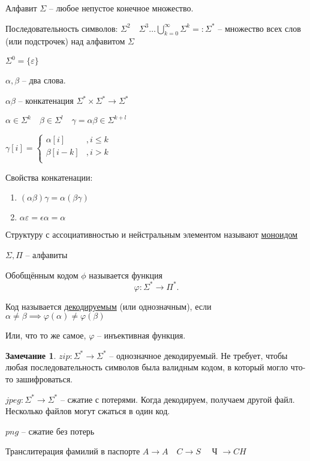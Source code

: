 \documentclass{book}
\theoremstyle{definition}
\newtheorem*{note}{Замечание}
\begin{document}
\begin{definition}
    Алфавит $\Sigma$ -- любое непустое конечное множество.
\end{definition}

Последовательность символов: $\Sigma^2\quad \Sigma^3 \ldots \bigcup\limits_{k=0}^{\infty }\Sigma^k =: \Sigma^*$ -- множество всех слов (или подстрочек) над алфавитом $\Sigma$

$\Sigma^0 = \{\varepsilon\}$

$\alpha, \beta$ -- два слова.

 \begin{definition}
    $\alpha \beta$ -- конкатенация  $\Sigma^*\times \Sigma^*\to \Sigma^*$

    $\alpha\in \Sigma^k\quad\beta\in \Sigma^l\quad \gamma = \alpha\beta \in \Sigma^{k+l}$

    $\gamma[i] = \begin{cases}
        \alpha[i]&,i\leqslant k\\
        \beta[i-k]&,i>k\\
    \end{cases}$ 
\end{definition}
Свойства конкатенации:
\begin{enumerate}
    \item $(\alpha\beta)\gamma = \alpha(\beta\gamma)$
    \item  $\alpha \varepsilon = \epsilon\alpha=\alpha$
\end{enumerate}

Структуру с ассоциативностью и нейстральным элементом называют \underline{моноидом}

\begin{definition}
$\Sigma, \Pi$ -- алфавиты

    Обобщённым кодом $\phi$ называется функция  \[
    \varphi:\Sigma^* \to \Pi^*
    .\] 
\end{definition}

\begin{definition}
    Код называется \underline{декодируемым} (или однозначным), если $\alpha\neq \beta\implies \varphi(\alpha)\neq \varphi(\beta)$

    Или, что то же самое, $\varphi$ -- инъективная функция.
\end{definition}

\begin{note}
    $zip: \Sigma^* \to \Sigma^*$ -- однозначное декодируемый. Не требует, чтобы любая последовательность символов была валидным кодом, в который могло что-то зашифроваться.

    $jpeg:\Sigma^* \to \Sigma^*$ -- сжатие с потерями. Когда декодируем, получаем другой файл. Несколько файлов могут сжаться в один код.

    $png$ -- сжатие без потерь

    Транслитерация фамилий в паспорте  $A\to A\quad C\to S\quad $ Ч $\to CH$
\end{note}
\end{document}
